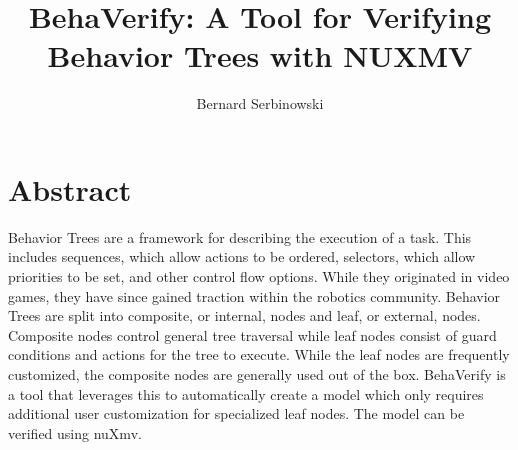 \documentclass[twocolumn]{article}
\title{BehaVerify: A Tool for Verifying Behavior Trees with NUXMV}
\author{Bernard Serbinowski}
\begin{document}





\maketitle
\thispagestyle{empty}

\section*{Abstract}

Behavior Trees are a framework for describing the execution of a task. This includes sequences, which allow actions to be ordered, selectors, which allow priorities to be set, and other control flow options. While they originated in video games, they have since gained traction within the robotics community. Behavior Trees are split into composite, or internal, nodes and leaf, or external, nodes. Composite nodes control general tree traversal while leaf nodes consist of guard conditions and actions for the tree to execute. While the leaf nodes are frequently customized, the composite nodes are generally used out of the box. BehaVerify is a tool that leverages this to automatically create a model which only requires additional user customization for specialized leaf nodes. The model can be verified using nuXmv.






\end{document}
